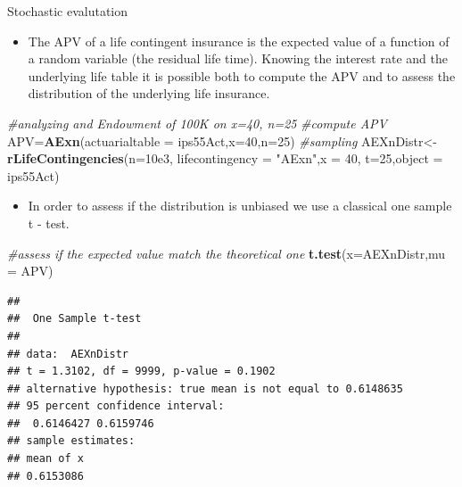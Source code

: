 \documentclass[ignorenonframetext,]{beamer}
\newenvironment{Shaded}{\begin{snugshade}}{\end{snugshade}}
\newcommand{\KeywordTok}[1]{\textcolor[rgb]{0.13,0.29,0.53}{\textbf{{#1}}}}
\newcommand{\DataTypeTok}[1]{\textcolor[rgb]{0.13,0.29,0.53}{{#1}}}
\newcommand{\DecValTok}[1]{\textcolor[rgb]{0.00,0.00,0.81}{{#1}}}
\newcommand{\FloatTok}[1]{\textcolor[rgb]{0.00,0.00,0.81}{{#1}}}
\newcommand{\StringTok}[1]{\textcolor[rgb]{0.31,0.60,0.02}{{#1}}}
\newcommand{\CommentTok}[1]{\textcolor[rgb]{0.56,0.35,0.01}{\textit{{#1}}}}
\newcommand{\NormalTok}[1]{{#1}}
\begin{document}
\begin{frame}[fragile]{Stochastic evalutation}

\begin{itemize}[<+->]
\itemsep1pt\parskip0pt
\item
  The APV of a life contingent insurance is the expected value of a
  function of a random variable (the residual life time). Knowing the
  interest rate and the underlying life table it is possible both to
  compute the APV and to assess the distribution of the underlying life
  insurance.
\end{itemize}

\begin{Shaded}
\begin{Highlighting}[]
\CommentTok{#analyzing and Endowment of 100K on x=40, n=25}
\CommentTok{#compute APV}
\NormalTok{APV=}\KeywordTok{AExn}\NormalTok{(}\DataTypeTok{actuarialtable =} \NormalTok{ips55Act,}\DataTypeTok{x=}\DecValTok{40}\NormalTok{,}\DataTypeTok{n=}\DecValTok{25}\NormalTok{) }
\CommentTok{#sampling}
\NormalTok{AEXnDistr<-}\KeywordTok{rLifeContingencies}\NormalTok{(}\DataTypeTok{n=}\FloatTok{10e3}\NormalTok{,}
\DataTypeTok{lifecontingency =} \StringTok{"AExn"}\NormalTok{,}\DataTypeTok{x =} \DecValTok{40}\NormalTok{,}
\DataTypeTok{t=}\DecValTok{25}\NormalTok{,}\DataTypeTok{object =} \NormalTok{ips55Act)}
\end{Highlighting}
\end{Shaded}

\end{frame}

\begin{frame}[fragile]

\begin{itemize}[<+->]
\itemsep1pt\parskip0pt
\item
  In order to assess if the distribution is unbiased we use a classical
  one sample t - test.
\end{itemize}

\begin{Shaded}
\begin{Highlighting}[]
\CommentTok{#assess if the expected value match the theoretical one}
\KeywordTok{t.test}\NormalTok{(}\DataTypeTok{x=}\NormalTok{AEXnDistr,}\DataTypeTok{mu =} \NormalTok{APV)}
\end{Highlighting}
\end{Shaded}

\begin{verbatim}
## 
##  One Sample t-test
## 
## data:  AEXnDistr
## t = 1.3102, df = 9999, p-value = 0.1902
## alternative hypothesis: true mean is not equal to 0.6148635
## 95 percent confidence interval:
##  0.6146427 0.6159746
## sample estimates:
## mean of x 
## 0.6153086
\end{verbatim}

\end{frame}
\end{document}
